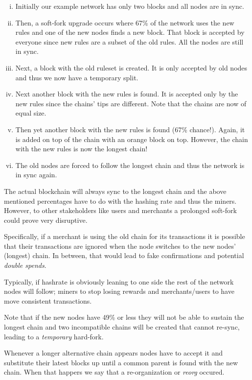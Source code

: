 \begin{enumerate}[(i)]
\item Initially our example network has only two blocks and all nodes are in sync.
\item Then, a soft-fork upgrade occurs where 67\% of the network uses the new rules and one of the new nodes finds a new block. That block is accepted by everyone since new rules are a subset of the old rules. All the nodes are still in sync.
\item Next, a block with the old ruleset is created. It is only accepted by old nodes and thus we now have a temporary split.
\item Next another block with the new rules is found. It is accepted only by the new rules since the chains' tips are different. Note that the chains are now of equal size.
\item Then yet another block with the new rules is found (67\% chance!). Again, it is added on top of the chain with an orange block on top. However, the chain with the new rules is now the longest chain! 
\item The old nodes are forced to follow the longest chain and thus the network is in sync again.
\end{enumerate}

The actual blockchain will always sync to the longest chain and the above mentioned percentages have to do with the hashing rate and thus the miners. However, to other stakeholders like users and merchants a prolonged soft-fork could prove very disruptive.

Specifically, if a merchant is using the old chain for its transactions it is possible that their transactions are ignored when the node switches to the new nodes’ (longest) chain. In between, that would lead to fake confirmations and potential \emph{double spends}.

Typically, if hashrate is obviously leaning to one side the rest of the network nodes will follow; miners to stop losing rewards and merchants/users to have move consistent transactions.

Note that if the new nodes have 49\% or less they will not be able to sustain the longest chain and two incompatible chains will be created that cannot re-sync, leading to a \emph{temporary} hard-fork.

\begin{note}
Whenever a longer alternative chain appears nodes have to accept it and substitute their latest blocks up until a common parent is found with the new chain. When that happers we say that a re-organization or \emph{reorg} occured.
\end{note}


